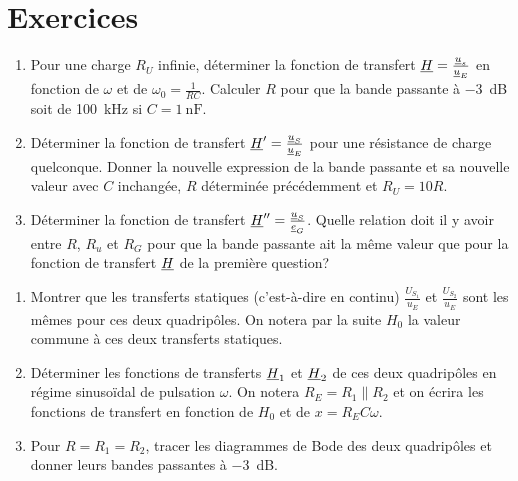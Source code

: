 \section{Exercices}%
\begin{exercice}%
	\begin{enumerate}
		\item Pour une charge \(R_U\) infinie, déterminer la fonction de transfert 
			\(\underline{H} = \frac{\underline{u}_s}{\underline{u}_E}\) en fonction de \(\omega\) et de \(\omega_0 
			= \frac{1}{RC}\). Calculer \(R\) pour que la bande passante à 
			\SI{-3}{\dB} soit de \SI{100}{\kilo\hertz} si \(C=\SI{1}{\nano\farad}\).
		\item Déterminer la fonction de transfert \(\underline{H}' = \frac{\underline{u}_S}{\underline{u}_E}\) 
			pour une résistance de charge quelconque. Donner la nouvelle expression 
			de la bande passante et sa nouvelle valeur avec \(C\) inchangée, \(R\) 
			déterminée précédemment et \(R_U = 10 R\).
		\item Déterminer la fonction de transfert \(\underline{H}'' = \frac{\underline{u}_S}{\underline{e}_G}\). 
			Quelle relation doit il y avoir entre \(R\), \(R_u\) et \(R_G\) pour que 
			la bande passante ait la même valeur que pour la fonction de transfert 
			\(\underline{H}\) de la première question?
	\end{enumerate}
\end{exercice}%
\begin{exercice}%
	\begin{enumerate}
		\item Montrer que les transferts statiques (c'est-à-dire en continu) 
			\(\frac{U_{S_1}}{u_E}\) et \(\frac{U_{S_2}}{u_E}\) sont les mêmes pour 
			ces deux quadripôles. On notera par la suite \(H_0\) la valeur commune à 
			ces deux transferts statiques.
		\item Déterminer les fonctions de transferts \(\underline{H}_1\) et \(\underline{H}_2\) de ces 
			deux quadripôles en régime sinusoïdal de pulsation \(\omega\). On notera 
			\(R_E = R_1 \parallel R_2\) et on écrira les fonctions de transfert en 
			fonction de \(H_0\) et de \(x = R_E C \omega\).
		\item Pour \(R = R_1 = R_2\), tracer les diagrammes de Bode des deux 
			quadripôles et donner leurs bandes passantes à \SI{-3}{\dB}.
	\end{enumerate}
\end{exercice}%
